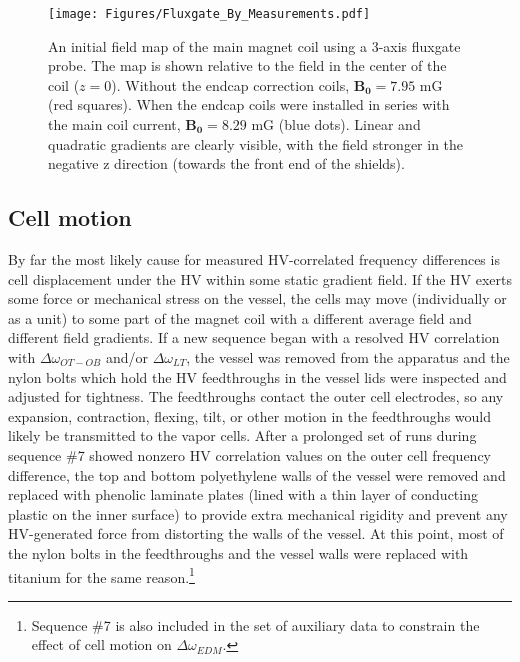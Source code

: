 \documentclass [10pt, twoside] {uwthesis}[2012/04/02]
\begin{document}
\begin{figure}
\begin{center}
\texttt{[image: Figures/Fluxgate\_By\_Measurements.pdf]}
\end{center}
\caption[Field map of $\mathbf{B_y}(z)$]%
{\narrower An initial field map of the main magnet coil using a 3-axis fluxgate probe. The map is shown relative to the field in the center of the coil ($z=0$). Without the endcap correction coils, $\mathbf{B_0} = 7.95$ mG (red squares). When the endcap coils were installed in series with the main coil current, $\mathbf{B_0} = 8.29$ mG (blue dots). Linear and quadratic gradients are clearly visible, with the field stronger in the negative z direction (towards the front end of the shields).}
\label{ByMap2010}
\end{figure}

\subsection{Cell motion}
By far the most likely cause for measured HV-correlated frequency differences is cell displacement under the HV within some static gradient field. If the HV exerts some force or mechanical stress on the vessel, the cells may move (individually or as a unit) to some part of the magnet coil with a different average field and different field gradients. If a new sequence began with a resolved HV correlation with $\Delta\omega_{OT-OB}$ and/or $\Delta\omega_{LT}$, the vessel was removed from the apparatus and the nylon bolts which hold the HV feedthroughs in the vessel lids were inspected and adjusted for tightness. The feedthroughs contact the outer cell electrodes, so any expansion, contraction, flexing, tilt, or other motion in the feedthroughs would likely be transmitted to the vapor cells. After a prolonged set of runs during sequence \#7 showed nonzero HV correlation values on the outer cell frequency difference, the top and bottom polyethylene walls of the vessel were removed and replaced with phenolic laminate plates (lined with a thin layer of conducting plastic on the inner surface) to provide extra mechanical rigidity and prevent any HV-generated force from distorting the walls of the vessel. At this point, most of the nylon bolts in the feedthroughs and the vessel walls were replaced with titanium for the same reason.\footnote{Sequence \#7 is also included in the set of auxiliary data to constrain the effect of cell motion on $\Delta\omega_{EDM}.$}
\end{document}
